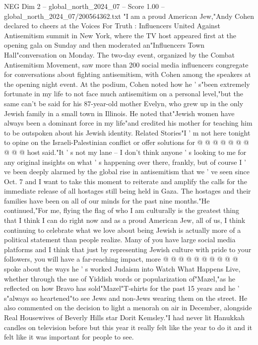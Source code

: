 \begin{textsample}{NEG Dim 2 – global\_north\_2024\_07 – Score 1.00 – global\_north\_2024\_07/200564362.txt}  \label{ex:f2_neg_060}
"I am a proud American Jew,"Andy Cohen declared to cheers at the Voices For Truth : Influencers United Against Antisemitism summit in New York, where the TV host appeared first at the opening gala on Sunday and then moderated an"Influencers Town Hall"conversation on Monday.
The two-day event, organized by the Combat Antisemitism Movement, saw more than 200 social media influencers congregate for conversations about fighting antisemitism, with Cohen among the speakers at the opening night event.
At the podium, Cohen noted how he ' s"been extremely fortunate in my life to not face much antisemitism on a personal level,"but the same can't be said for his 87-year-old mother Evelyn, who grew up in the only Jewish family in a small town in Illinois.
He noted that"Jewish women have always been a dominant force in my life"and credited his mother for teaching him to be outspoken about his Jewish identity.
Related Stories"I ' m not here tonight to opine on the Israeli-Palestinian conflict or offer solutions for @ @ @ @ @ @ @ @ @ @ host said."It ' s not my lane -- I don't think anyone ' s looking to me for any original insights on what ' s happening over there, frankly, but of course I ' ve been deeply alarmed by the global rise in antisemitism that we ' ve seen since Oct. 7 and I want to take this moment to reiterate and amplify the calls for the immediate release of all hostages still being held in Gaza.
The hostages and their families have been on all of our minds for the past nine months."He continued,"For me, flying the flag of who I am culturally is the greatest thing that I think I can do right now and as a proud American Jew, all of us, I think continuing to celebrate what we love about being Jewish is actually more of a political statement than people realize.
Many of you have large social media platforms and I think that just by representing Jewish culture with pride to your followers, you will have a far-reaching impact, more @ @ @ @ @ @ @ @ @ @ spoke about the ways he ' s worked Judaism into Watch What Happens Live, whether through the use of Yiddish words or popularization of"Mazel,"as he reflected on how Bravo has sold"Mazel"T-shirts for the past 15 years and he ' s"always so heartened"to see Jews and non-Jews wearing them on the street.
He also commented on the decision to light a menorah on air in December, alongside Real Housewives of Beverly Hills star Dorit Kemsley."I had never lit Hanukkah candles on television before but this year it really felt like the year to do it and it felt like it was important for people to see.

\end{textsample}
